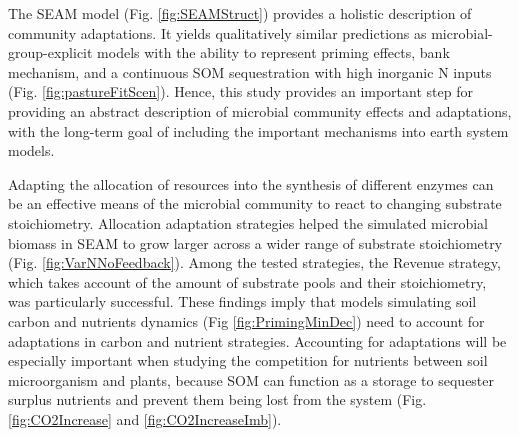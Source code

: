 \conclusions   
 
The SEAM model (Fig. \ref{fig:SEAMStruct}) provides a holistic description of
community adaptations. It yields qualitatively similar predictions as
microbial-group-explicit models with the ability to represent priming effects,
bank mechanism, and a continuous SOM sequestration with high inorganic N inputs
(Fig.
\ref{fig:pastureFitScen}). Hence, this study provides an important step for
providing an abstract description of microbial community effects and
adaptations, with the long-term goal of including the important mechanisms into
earth system models.

Adapting the allocation of resources into the synthesis of different enzymes can
be an effective means of the microbial community to react to changing substrate
stoichiometry. Allocation adaptation strategies helped the simulated microbial
biomass in SEAM to grow larger across a wider range of substrate stoichiometry
(Fig. \ref{fig:VarNNoFeedback}). Among the tested strategies, the Revenue
strategy, which takes account of the amount of substrate pools and their
stoichiometry, was particularly successful.
These findings imply that models simulating soil carbon and nutrients dynamics
(Fig \ref{fig:PrimingMinDec}) need to account for adaptations in carbon and
nutrient strategies. Accounting for adaptations will be especially important
when studying the competition for nutrients between soil microorganism and
plants, because SOM can function as a storage to sequester surplus nutrients and
prevent them being lost from the system (Fig.
\ref{fig:CO2Increase} and \ref{fig:CO2IncreaseImb}).




